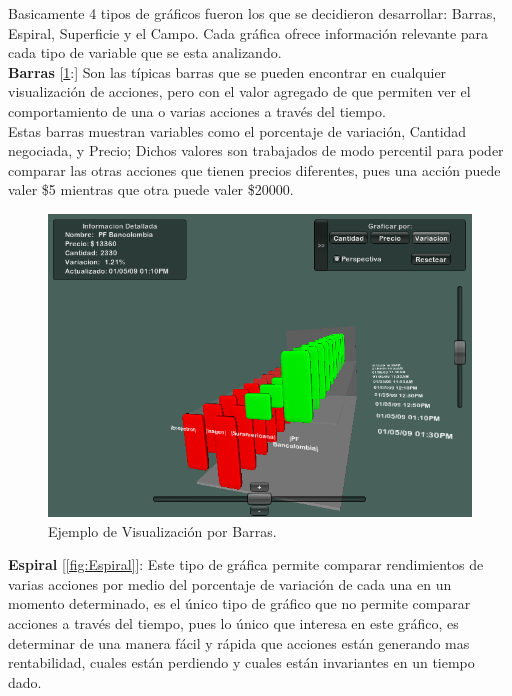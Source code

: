 Basicamente 4 tipos de gráficos fueron los que se decidieron desarrollar: Barras, Espiral, Superficie y el Campo. Cada gráfica ofrece información relevante para cada tipo de variable que se esta analizando. \\

\textbf{Barras} [\ref{fig:Barras}:] Son las típicas barras que se pueden encontrar en cualquier visualización de acciones, pero con el valor agregado de que permiten ver el comportamiento de una o varias acciones a través del tiempo.\\

Estas barras muestran variables como el porcentaje de variación, Cantidad negociada, y Precio; Dichos valores son trabajados de modo percentil para poder comparar las otras acciones que tienen precios diferentes, pues una acción puede valer \$5 mientras que otra puede valer \$20000.\\


\begin{figure}[h]
	\centering
		\includegraphics[scale=0.5]{Barras.png}
		\caption{Ejemplo de Visualización por Barras.}
	\label{fig:Barras}
\end{figure}


\textbf{Espiral} [\ref{fig:Espiral}]: Este tipo de gráfica permite comparar rendimientos de varias acciones por medio del porcentaje de variación de cada una en un momento determinado, es el único tipo de gráfico que no permite comparar acciones a través del tiempo, pues lo único que interesa en este gráfico, es determinar de una manera fácil y rápida que acciones están generando mas rentabilidad, cuales están perdiendo y cuales están invariantes en un tiempo dado.\\


